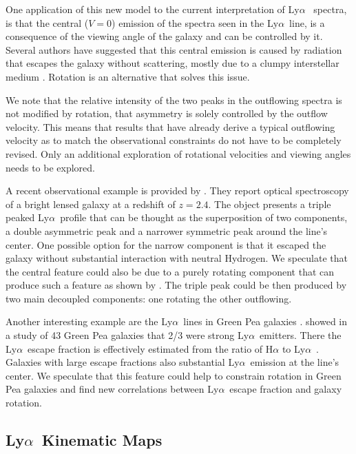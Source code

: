 \documentclass[a4paper,fleqn,usenatbib]{mnras}
\newcommand{\lya}{\ifmmode{{\rm Ly}\alpha}\else Ly$\alpha$\ \fi}
\begin{document}
One application of this new model to the current interpretation of \lya
spectra, is that the central ($V=0$) emission of the spectra seen in the
\lya line, is a consequence of the viewing angle of the galaxy and can be
controlled by it. 
Several authors have suggested that this central emission is caused by
radiation that escapes the galaxy without scattering, mostly due to a
clumpy interstellar medium \citep{Hansen06, 2016ApJ...833L..26G}.
Rotation is an alternative that solves this issue. 

We note that the relative intensity of the two peaks in the outflowing
spectra is not modified by rotation, that asymmetry is solely
controlled by the outflow velocity.
This means that results that have already derive a typical outflowing
velocity as to match the observational constraints do not have to be
completely revised. 
Only an additional exploration of rotational velocities and viewing
angles needs to be explored.

A recent observational example is provided by
\cite{2017A&A...608L...4R}.
They report optical spectroscopy of a bright lensed galaxy at a
redshift of $z=2.4$. 
The object presents a triple peaked \lya profile that can be thought
as the superposition of two components, a double asymmetric peak and a
narrower symmetric peak around the line's center.
One possible option for the narrow component is that it escaped the
galaxy without substantial interaction with neutral Hydrogen.
We speculate that the central feature could also be due to a purely 
rotating component that can produce such a feature as shown by
\cite{tololo}. The triple peak could be then produced by two main
decoupled components: one rotating the other outflowing.

Another interesting example are the \lya lines in Green Pea galaxies \citep{2016ApJ...820..130Y}.
\cite{2017ApJ...844..171Y} showed in a study of 43 Green Pea galaxies
that 2/3 were strong \lya emitters. 
There the \lya escape fraction is effectively estimated from the ratio
of H$\alpha$ to \lya.
Galaxies with large escape fractions also substantial \lya emission at
the line's center. 
We speculate that this feature could help to constrain rotation in
Green Pea galaxies and find new correlations between \lya escape
fraction and galaxy rotation.


\subsection{\lya Kinematic Maps}
\end{document}
